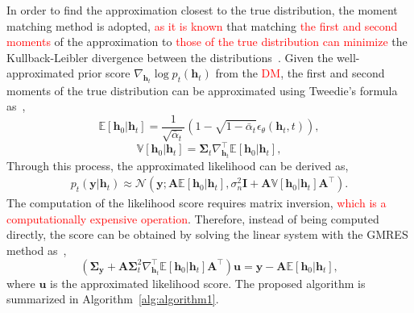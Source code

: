 \documentclass[lettersize,journal]{IEEEtran}
\newcommand{\tred}{\textcolor{red}}
\begin{document}
In order to find the approximation closest to the true distribution, the moment matching method is adopted, \tred{as it is known} that matching \tred{the first and second moments} of the approximation to \tred{those of the true distribution can minimize} the Kullback-Leibler divergence between the distributions~\cite{bishopPatternRecognitionMachine2006}.
Given the well-approximated prior score $\nabla_{\mathbf{h}_{t}}\log p_{t}(\mathbf{h}_{t})$ from the \tred{DM}, the first and second moments of the true distribution can be approximated using Tweedie's formula as~\cite{efronTweediesFormulaSelection2011},
\begin{equation}
\mathbb{E}[\mathbf{h}_{0}|\mathbf{h}_{t}] = \frac{1}{\sqrt{ \bar{\alpha}_{t} }}(1-\sqrt{ 1-\bar{\alpha}_{t} }\epsilon_{\theta}(\mathbf{h}_{t},t)),
\end{equation}
\begin{equation}
\mathbb{V}[\mathbf{h}_{0}|\mathbf{h}_{t}] = \boldsymbol{\Sigma}_{t}\nabla_{\mathbf{h}_{t}}^{\top}\mathbb{E}[\mathbf{h}_{0}|\mathbf{h}_{t}],
\end{equation}
Through this process, the approximated likelihood can be derived as,
\begin{equation}
\begin{aligned}
p_{t}(\mathbf{y}|\mathbf{h}_{t}) \approx \mathcal{N}(\mathbf{y}; \mathbf{A}\mathbb{E}[\mathbf{h}_{0}|\mathbf{h}_{t}], \sigma_{n}^{2}\mathbf{I}+\mathbf{A}\mathbb{V}[\mathbf{h}_{0}|\mathbf{h}_{t}]\mathbf{A}^{\top}).
\end{aligned}
\end{equation}
The computation of the likelihood score requires matrix inversion, \tred{which is a computationally expensive operation}. Therefore, instead of being computed directly, the score can be obtained by solving the linear system with the GMRES method as~\cite{saadGMRESGeneralizedMinimal1986},
\begin{equation}
(\boldsymbol{\Sigma}_{\mathbf{y}}+\mathbf{A}\boldsymbol{\Sigma}_{t}^{2}\nabla_{\mathbf{h}_{t}}^{\top}\mathbb{E}[\mathbf{h}_{0}|\mathbf{h}_{t}]\mathbf{A}^{\top})\mathbf{u} = \mathbf{y}- \mathbf{A}\mathbb{E}[\mathbf{h}_{0}|\mathbf{h}_{t}],
\end{equation}
where $\mathbf{u}$ is the approximated likelihood score. The proposed algorithm is summarized in Algorithm~\ref{alg:algorithm1}.
\end{document}
